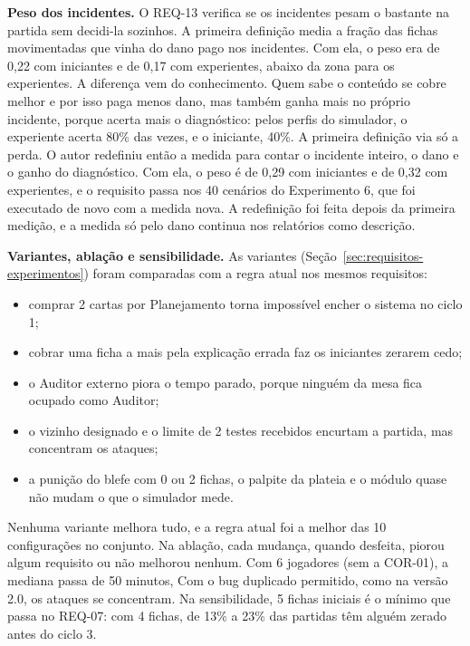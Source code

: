 \textbf{Peso dos incidentes.} O REQ-13 verifica se os incidentes pesam o bastante na partida sem decidi-la
sozinhos. A primeira definição media a fração das fichas movimentadas que vinha do dano pago nos incidentes. Com
ela, o peso era de 0,22 com iniciantes e de 0,17 com experientes, abaixo da zona para os experientes. A diferença
vem do conhecimento. Quem sabe o conteúdo se cobre melhor e por isso paga menos dano, mas também ganha mais no
próprio incidente, porque acerta mais o diagnóstico: pelos perfis do simulador, o experiente acerta 80\% das
vezes, e o iniciante, 40\%. A primeira definição via só a perda. O autor redefiniu então a medida para contar o
incidente inteiro, o dano e o ganho do diagnóstico. Com ela, o peso é de 0,29 com iniciantes e de 0,32 com
experientes, e o requisito passa nos 40 cenários do Experimento 6, que foi executado de novo com a medida nova. A
redefinição foi feita depois da primeira medição, e a medida só pelo dano continua nos relatórios como descrição.

\textbf{Variantes, ablação e sensibilidade.} As variantes (Seção~\ref{sec:requisitos-experimentos}) foram comparadas com a
regra atual nos mesmos requisitos:
\begin{itemize}
  \item comprar 2 cartas por Planejamento torna impossível encher o sistema no ciclo 1;
  \item cobrar uma ficha a mais pela explicação errada faz os iniciantes zerarem cedo;
  \item o Auditor externo piora o tempo parado, porque ninguém da mesa fica ocupado como Auditor;
  \item o vizinho designado e o limite de 2 testes recebidos encurtam a partida, mas concentram os ataques;
  \item a punição do blefe com 0 ou 2 fichas, o palpite da plateia e o módulo quase não mudam o que o simulador
    mede.
\end{itemize}
Nenhuma variante melhora tudo, e a regra atual foi a melhor das 10 configurações no conjunto. Na ablação, cada
mudança, quando desfeita, piorou algum requisito ou não melhorou nenhum. Com 6 jogadores (sem a COR-01), a
mediana passa de 50 minutos,  Com o bug duplicado permitido, como na
versão 2.0, os ataques se concentram.  Na sensibilidade, 5 fichas iniciais é o mínimo que passa no REQ-07: com 4
fichas, de 13\% a 23\% das partidas têm alguém zerado antes do ciclo 3.


